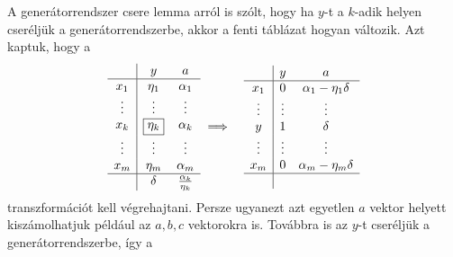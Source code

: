 \documentclass[9pt, a4paper, showtrims]{memoir}
\theoremstyle{plain}
\theoremstyle{remark}
\theoremstyle{definition}
\begin{document}
A generátorrendszer csere lemma arról is szólt, hogy ha $y$-t a $k$-adik helyen cseréljük a generátorrendszerbe,
akkor a fenti táblázat hogyan változik.
Azt kaptuk, hogy a
\begin{eqnarray}\label{alg:G-J}
	\begin{array}{c|cc}
		       & y              & a                       \\
		\hline
		x_1    & \eta_1         & \alpha_1                \\
		\vdots & \vdots         & \vdots                  \\
		x_k    & \boxed{\eta_k} & \alpha_k                \\
		\vdots & \vdots         & \vdots                  \\
		x_m    & \eta_m         & \alpha_m                \\
		\hline
		       & \delta         & \frac{\alpha_k}{\eta_k}
	\end{array}
	&\implies&
	\begin{array}{c|cc}
		       & y      & a                     \\
		\hline
		x_1    & 0      & \alpha_1-\eta_1\delta \\
		\vdots & \vdots & \vdots                \\
		y      & 1      & \delta                \\
		\vdots & \vdots & \vdots                \\
		x_m    & 0      & \alpha_m-\eta_m\delta \\
		\hline
		       &        &
	\end{array}
\end{eqnarray}
transzformációt kell végrehajtani.
Persze ugyanezt azt egyetlen $a$ vektor helyett kiszámolhatjuk például az $a,b,c$ vektorokra is.
Továbbra is az $y$-t cseréljük a generátorrendszerbe, így a
\end{document}
